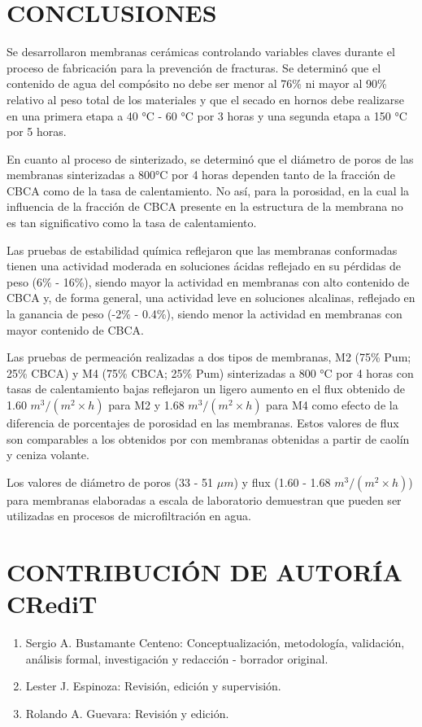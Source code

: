 \documentclass{article}
\begin{document}
\newpage
\section{CONCLUSIONES}
Se desarrollaron membranas cerámicas controlando variables claves durante el proceso de fabricación para la prevención de fracturas. 
Se determinó que el contenido de agua del compósito no debe ser menor al 76\% ni mayor al 90\% relativo al peso total de los materiales 
y que el secado en hornos debe realizarse en una primera etapa a 40 °C - 60 °C por 3 horas y una segunda etapa a 150 °C por 5 horas. 

En cuanto al proceso de sinterizado, se determinó que el diámetro de poros de las membranas sinterizadas a 800°C por 4 horas dependen 
tanto de la fracción de CBCA como de la tasa de calentamiento. No así, para la porosidad, en la cual la influencia de la fracción de 
CBCA presente en la estructura de la membrana no es tan significativo como la tasa de calentamiento. 

Las pruebas de estabilidad química reflejaron que las membranas conformadas tienen una actividad moderada en soluciones ácidas 
reflejado en su pérdidas de peso (6\% - 16\%), siendo mayor la actividad en membranas con alto contenido de CBCA y, de forma general, 
una actividad leve en soluciones alcalinas, reflejado en la ganancia de peso (-2\% - 0.4\%), siendo menor la actividad en 
membranas con mayor contenido de CBCA. 

Las pruebas de permeación realizadas a dos tipos de membranas, M2 (75\% Pum; 25\% CBCA) y M4 (75\% CBCA; 25\% Pum) sinterizadas a 
800 °C por 4 horas con tasas de calentamiento bajas reflejaron un ligero aumento en el flux obtenido de 1.60 $m^3/(m^2 \times h)$ para M2 y 
1.68 $m^3/(m^2 \times h)$ para M4 como efecto de la diferencia de porcentajes de porosidad en las membranas. 
Estos valores de flux son comparables a los obtenidos por \textcite{Rawat2018} con membranas obtenidas a 
partir de caolín y ceniza volante. 

Los valores de diámetro de poros (33 - 51 $\mu m$) y flux (1.60 - 1.68 $m^3/(m^2 \times h)$) para membranas elaboradas a escala de 
laboratorio demuestran que pueden ser utilizadas en procesos de microfiltración en agua. 

\newpage
\section{CONTRIBUCIÓN DE AUTORÍA CRediT}
\begin{enumerate}
    \item Sergio A. Bustamante Centeno: Conceptualización, metodología, validación, análisis formal, investigación y redacción - borrador original. 
    \item Lester J. Espinoza: Revisión, edición y supervisión. 
    \item Rolando A. Guevara: Revisión y edición. 

\end{enumerate}
\end{document}
